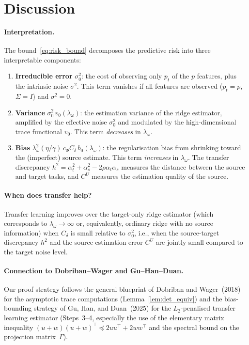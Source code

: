 \documentclass[11pt]{article}
\theoremstyle{definition}
\newcommand{\Sig}{\Sigma}
\begin{document}
\section{Discussion}\label{sec:discussion}
 
\paragraph{Interpretation.}
The bound~\eqref{eq:risk_bound} decomposes the predictive risk into
three interpretable components:
\begin{enumerate}[label=(\roman*),nosep]
\item \textbf{Irreducible error} $\sigma_0^2$: the cost of observing
  only $p_t$ of the $p$ features, plus the intrinsic noise $\sigma^2$.
  This term vanishes if all features are observed ($p_t=p$, $\Sig=I$)
  and $\sigma^2=0$.
\item \textbf{Variance}
  $\sigma_0^2\,v_0(\lambda_\omega)$: the estimation variance of the
  ridge estimator, amplified by the effective noise $\sigma_0^2$ and
  modulated by the high-dimensional trace functional $v_0$.  This term
  \emph{decreases} in $\lambda_\omega$.
\item \textbf{Bias}
  $\lambda_\omega^2(\eta/\gamma)\,c_\Phi C_\delta\,b_0(\lambda_\omega)$:
  the regularisation bias from shrinking toward the (imperfect) source
  estimate.  This term \emph{increases} in $\lambda_\omega$.  The
  transfer discrepancy $h^2=\alpha_t^2+\alpha_s^2-2\rho\alpha_t\alpha_s$
  measures the distance between the source and target tasks, and
  $C^U$ measures the estimation quality of the source.
\end{enumerate}
 
\paragraph{When does transfer help?}
Transfer learning improves over the target-only ridge estimator
(which corresponds to $\lambda_\omega\to\infty$ or, equivalently,
ordinary ridge with no source information) when $C_\delta$ is small
relative to $\sigma_0^2$, i.e., when the source-target discrepancy
$h^2$ and the source estimation error $C^U$ are jointly small compared
to the target noise level.
 
\paragraph{Connection to Dobriban--Wager and Gu--Han--Duan.}
Our proof strategy follows the general blueprint of
Dobriban and Wager~(2018) for the asymptotic trace computations
(Lemma~\ref{lem:det_equiv}) and the
bias-bounding strategy of Gu, Han, and Duan~(2025) for the
$L_2$-penalised transfer learning estimator
(Steps~3--4, especially the use of the elementary matrix inequality
$(u+w)(u+w)^\top\preceq 2uu^\top+2ww^\top$ and the spectral bound on
the projection matrix~$\Gamma$).
 
\end{document}
